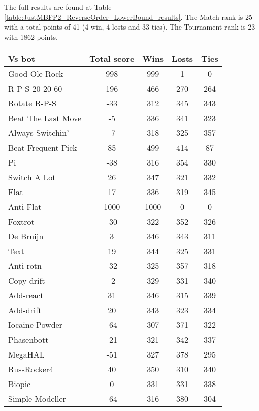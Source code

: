 The full results are found at Table \ref{table:JustMBFP2_ReverseOrder_LowerBound_results}. The Match rank is 25 with a total points of 41 (4 win, 4 losts and 33 ties). The Tournament rank is 23 with 1862 points.

\begin{table*}
    \caption{JustMBFP2_ReverseOrder_LowerBound results}
    \label{table:JustMBFP2_ReverseOrder_LowerBound_results}
    \centering
    \begin{tabular}{|l|c|c|c|c|}
        \hline
        \textbf{Vs bot} & \textbf{Total score} & \textbf{Wins} & \textbf{Losts} & \textbf{Ties} \\ \hline
Good Ole Rock & 998 & 999 & 1 & 0 \\ \hline 
R-P-S 20-20-60 & 196 & 466 & 270 & 264 \\ \hline 
Rotate R-P-S & -33 & 312 & 345 & 343 \\ \hline 
Beat The Last Move & -5 & 336 & 341 & 323 \\ \hline 
Always Switchin' & -7 & 318 & 325 & 357 \\ \hline 
Beat Frequent Pick & 85 & 499 & 414 & 87 \\ \hline 
Pi & -38 & 316 & 354 & 330 \\ \hline 
Switch A Lot & 26 & 347 & 321 & 332 \\ \hline 
Flat & 17 & 336 & 319 & 345 \\ \hline 
Anti-Flat & 1000 & 1000 & 0 & 0 \\ \hline 
Foxtrot & -30 & 322 & 352 & 326 \\ \hline 
De Bruijn & 3 & 346 & 343 & 311 \\ \hline 
Text & 19 & 344 & 325 & 331 \\ \hline 
Anti-rotn & -32 & 325 & 357 & 318 \\ \hline 
Copy-drift & -2 & 329 & 331 & 340 \\ \hline 
Add-react & 31 & 346 & 315 & 339 \\ \hline 
Add-drift & 20 & 343 & 323 & 334 \\ \hline 
Iocaine Powder & -64 & 307 & 371 & 322 \\ \hline 
Phasenbott & -21 & 321 & 342 & 337 \\ \hline 
MegaHAL & -51 & 327 & 378 & 295 \\ \hline 
RussRocker4 & 40 & 350 & 310 & 340 \\ \hline 
Biopic & 0 & 331 & 331 & 338 \\ \hline 
Simple Modeller & -64 & 316 & 380 & 304 \\ \hline 

\end{tabular}
\end{table*}
